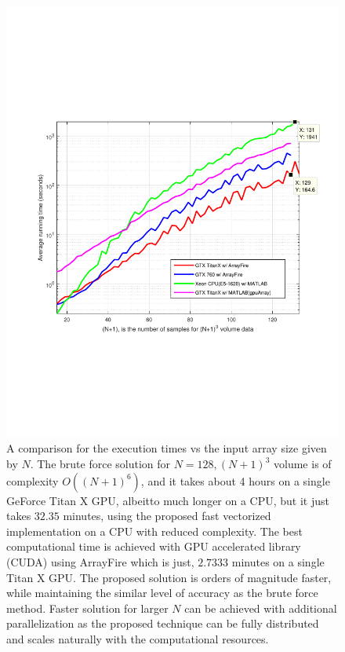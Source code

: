 \documentclass{UCF_ETD}
\begin{document}
 \begin{figure}[H]
 \begin{center}
 \includegraphics[scale=0.7]{PolarSphericalDFT/VolumeRunningTime}
 \caption{A comparison for the execution times vs the input array size given by $N$. The brute force solution for $N = 128, (N+1)^3$ volume %
 is of complexity $O((N+1)^6)$,
  and it takes about 4 hours on a single GeForce Titan X GPU, albeitto  much  longer on a CPU, but it just takes $32.35$ minutes, using the proposed fast vectorized implementation on a CPU with reduced complexity. The best computational time is achieved with GPU accelerated library (CUDA) using ArrayFire \cite{ArrayFire} which is just, $ %
  2.7333$ minutes on a single Titan X GPU. The proposed solution is orders of magnitude faster, while maintaining the similar level of accuracy as the brute force method. Faster solution for larger $N$ can be achieved with additional parallelization as the proposed technique can be fully distributed and scales naturally with the computational resources.}
 \label{VolumeComputationRunningTime}
 \end{center}
 \end{figure}
 
\end{document}
